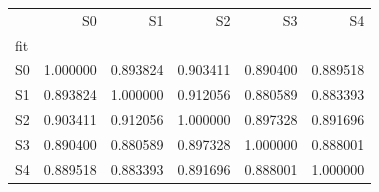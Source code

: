 \begin{tabular}{lrrrrr}
\toprule
 & S0 & S1 & S2 & S3 & S4 \\
fit &  &  &  &  &  \\
\midrule
S0 & 1.000000 & 0.893824 & 0.903411 & 0.890400 & 0.889518 \\
S1 & 0.893824 & 1.000000 & 0.912056 & 0.880589 & 0.883393 \\
S2 & 0.903411 & 0.912056 & 1.000000 & 0.897328 & 0.891696 \\
S3 & 0.890400 & 0.880589 & 0.897328 & 1.000000 & 0.888001 \\
S4 & 0.889518 & 0.883393 & 0.891696 & 0.888001 & 1.000000 \\
\bottomrule
\end{tabular}
